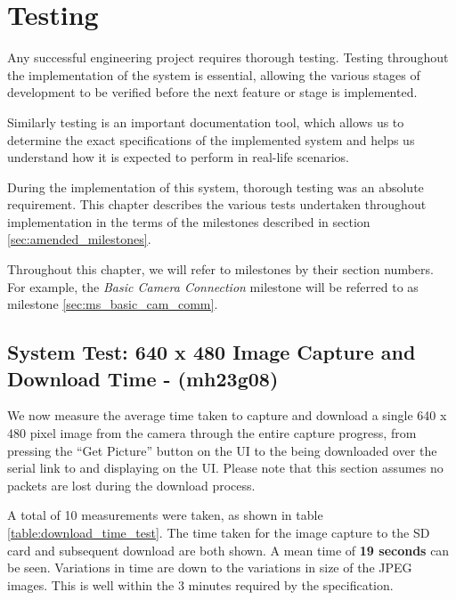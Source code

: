 \chapter{Testing}
Any successful engineering project requires thorough testing. Testing throughout
the implementation of the system is essential, allowing the various stages of 
development to be verified before the next feature or stage is implemented.

Similarly testing is an important documentation tool, which allows us to determine the
exact specifications of the implemented system and helps us understand how it is 
expected to perform in real-life scenarios.

During the implementation of this system, thorough testing was an absolute
requirement. This chapter describes the various tests undertaken
throughout implementation in the terms of the milestones described in section
\ref{sec:amended_milestones}. 

Throughout this chapter, we will refer to milestones by their section numbers.
For example, the \emph{Basic Camera Connection} milestone will be referred
to as milestone \ref{sec:ms_basic_cam_comm}.









\section{System Test: 640 x 480 Image Capture and Download Time - (mh23g08)}

We now measure the average time taken to capture and download a single 640 x 480
pixel image from the camera through the entire capture progress, from pressing the 
``Get Picture'' button on the UI to the being downloaded over the serial link to and
displaying on the UI. Please note that this section assumes no packets are lost during
the download process.

A total of 10 measurements were taken, as shown in table \ref{table:download_time_test}.
The time taken for the image capture to the SD card and subsequent download are both
shown. A mean time of \textbf{19 seconds} can be seen. Variations in time are down to the
variations in size of the JPEG images. This is well within the 3 minutes required by the specification.

